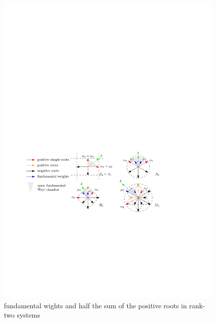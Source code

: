 \begin{itemize}
	\begin{figure}[H]
		\centering
		\includegraphics[scale=1]{figures/fundamental wights and half the sum of the positive roots in rank-two systems.pdf}
		\caption{fundamental wights and half the sum of the positive roots in rank-two systems}
	\end{figure}
\end{itemize}

